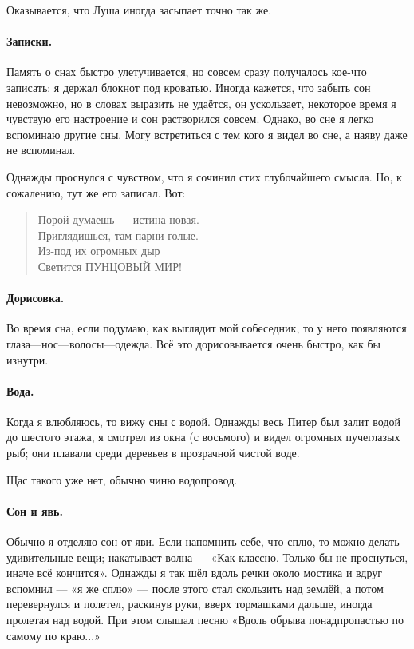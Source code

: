 \documentclass{book}
\begin{document}
Оказывается, что Луша иногда засыпает точно так же.

\paragraph{Записки.}
Память о снах быстро улетучивается, но совсем сразу получалось кое-что записать;
я держал блокнот под кроватью.
Иногда кажется, что забыть сон невозможно, но в словах выразить не удаётся, он ускользает, некоторое время я чувствую его настроение и сон растворился совсем.
Однако, во сне я легко вспоминаю другие сны.
Могу встретиться с тем кого я видел во сне, а наяву даже не вспоминал.

Однажды проснулся с чувством, что я сочинил стих глубочайшего смысла.
Но, к сожалению, тут же его записал.
Вот:
\begin{verse}
Порой думаешь --- истина новая.\\
Приглядишься, там парни голые.\\
Из-под их огромных дыр\\
Светится ПУНЦОВЫЙ МИР!
\end{verse}

\paragraph{Дорисовка.}
Во время сна, если подумаю, как выглядит мой собеседник, то у него появляются глаза---нос---волосы---одежда.
Всё это дорисовывается очень быстро, как бы изнутри.

\paragraph{Вода.}
Когда я влюбляюсь, то вижу сны с водой.
Однажды весь Питер был залит водой до шестого этажа, я смотрел из окна (с восьмого) и видел огромных пучеглазых рыб; они плавали среди деревьев в прозрачной чистой воде.

Щас такого уже нет, обычно чиню водопровод.

\paragraph{Сон и явь.}
Обычно я отделяю сон от яви.
Если напомнить себе, что сплю, то можно делать удивительные вещи;
накатывает волна --- «Как классно. Только бы не проснуться, иначе всё кончится».
Однажды я так шёл вдоль речки около мостика и вдруг вспомнил --- «я же сплю» --- после этого стал скользить над землёй, а потом перевернулся и полетел, раскинув руки, вверх тормашками дальше, иногда пролетая над водой.
При этом слышал песню «Вдоль обрыва понадпропастью по самому по краю...»
\end{document}
